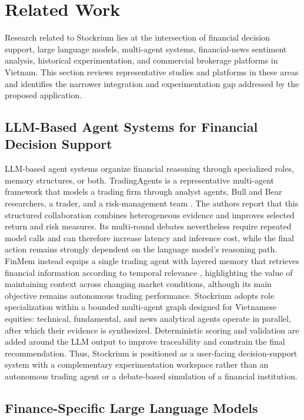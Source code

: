 \section{Related Work}
\label{sec:related-work}

Research related to Stockrium lies at the intersection of financial decision support, large language models, multi-agent systems, financial-news sentiment analysis, historical experimentation, and commercial brokerage platforms in Vietnam. This section reviews representative studies and platforms in these areas and identifies the narrower integration and experimentation gap addressed by the proposed application.

\subsection{LLM-Based Agent Systems for Financial Decision Support}

LLM-based agent systems organize financial reasoning through specialized roles, memory structures, or both. TradingAgents is a representative multi-agent framework that models a trading firm through analyst agents, Bull and Bear researchers, a trader, and a risk-management team \cite{xiao2024tradingagents}. The authors report that this structured collaboration combines heterogeneous evidence and improves selected return and risk measures. Its multi-round debates nevertheless require repeated model calls and can therefore increase latency and inference cost, while the final action remains strongly dependent on the language model's reasoning path. FinMem instead equips a single trading agent with layered memory that retrieves financial information according to temporal relevance \cite{yu2023finmem}, highlighting the value of maintaining context across changing market conditions, although its main objective remains autonomous trading performance. Stockrium adopts role specialization within a bounded multi-agent graph designed for Vietnamese equities: technical, fundamental, and news analytical agents operate in parallel, after which their evidence is synthesized. Deterministic scoring and validation are added around the LLM output to improve traceability and constrain the final recommendation. Thus, Stockrium is positioned as a user-facing decision-support system with a complementary experimentation workspace rather than an autonomous trading agent or a debate-based simulation of a financial institution.

\subsection{Finance-Specific Large Language Models}

